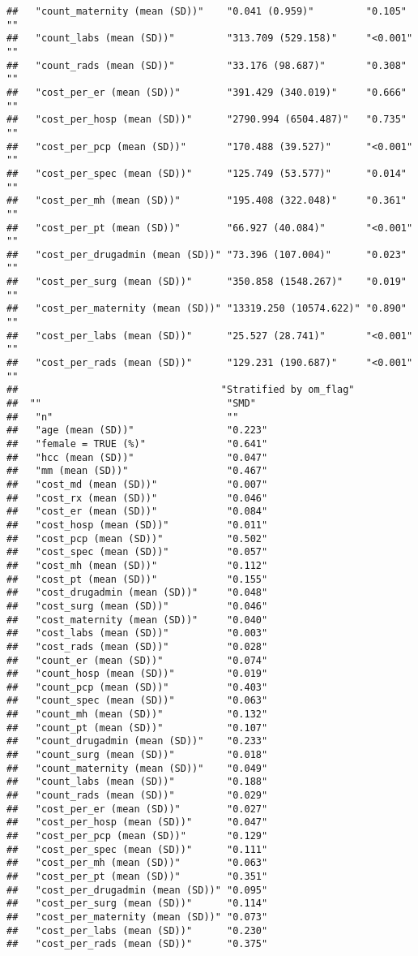 \documentclass[]{article}
\begin{document}
\begin{verbatim}
##   "count_maternity (mean (SD))"    "0.041 (0.959)"         "0.105"  ""    
##   "count_labs (mean (SD))"         "313.709 (529.158)"     "<0.001" ""    
##   "count_rads (mean (SD))"         "33.176 (98.687)"       "0.308"  ""    
##   "cost_per_er (mean (SD))"        "391.429 (340.019)"     "0.666"  ""    
##   "cost_per_hosp (mean (SD))"      "2790.994 (6504.487)"   "0.735"  ""    
##   "cost_per_pcp (mean (SD))"       "170.488 (39.527)"      "<0.001" ""    
##   "cost_per_spec (mean (SD))"      "125.749 (53.577)"      "0.014"  ""    
##   "cost_per_mh (mean (SD))"        "195.408 (322.048)"     "0.361"  ""    
##   "cost_per_pt (mean (SD))"        "66.927 (40.084)"       "<0.001" ""    
##   "cost_per_drugadmin (mean (SD))" "73.396 (107.004)"      "0.023"  ""    
##   "cost_per_surg (mean (SD))"      "350.858 (1548.267)"    "0.019"  ""    
##   "cost_per_maternity (mean (SD))" "13319.250 (10574.622)" "0.890"  ""    
##   "cost_per_labs (mean (SD))"      "25.527 (28.741)"       "<0.001" ""    
##   "cost_per_rads (mean (SD))"      "129.231 (190.687)"     "<0.001" ""    
##                                   "Stratified by om_flag"
##  ""                                "SMD"  
##   "n"                              ""     
##   "age (mean (SD))"                "0.223"
##   "female = TRUE (%)"              "0.641"
##   "hcc (mean (SD))"                "0.047"
##   "mm (mean (SD))"                 "0.467"
##   "cost_md (mean (SD))"            "0.007"
##   "cost_rx (mean (SD))"            "0.046"
##   "cost_er (mean (SD))"            "0.084"
##   "cost_hosp (mean (SD))"          "0.011"
##   "cost_pcp (mean (SD))"           "0.502"
##   "cost_spec (mean (SD))"          "0.057"
##   "cost_mh (mean (SD))"            "0.112"
##   "cost_pt (mean (SD))"            "0.155"
##   "cost_drugadmin (mean (SD))"     "0.048"
##   "cost_surg (mean (SD))"          "0.046"
##   "cost_maternity (mean (SD))"     "0.040"
##   "cost_labs (mean (SD))"          "0.003"
##   "cost_rads (mean (SD))"          "0.028"
##   "count_er (mean (SD))"           "0.074"
##   "count_hosp (mean (SD))"         "0.019"
##   "count_pcp (mean (SD))"          "0.403"
##   "count_spec (mean (SD))"         "0.063"
##   "count_mh (mean (SD))"           "0.132"
##   "count_pt (mean (SD))"           "0.107"
##   "count_drugadmin (mean (SD))"    "0.233"
##   "count_surg (mean (SD))"         "0.018"
##   "count_maternity (mean (SD))"    "0.049"
##   "count_labs (mean (SD))"         "0.188"
##   "count_rads (mean (SD))"         "0.029"
##   "cost_per_er (mean (SD))"        "0.027"
##   "cost_per_hosp (mean (SD))"      "0.047"
##   "cost_per_pcp (mean (SD))"       "0.129"
##   "cost_per_spec (mean (SD))"      "0.111"
##   "cost_per_mh (mean (SD))"        "0.063"
##   "cost_per_pt (mean (SD))"        "0.351"
##   "cost_per_drugadmin (mean (SD))" "0.095"
##   "cost_per_surg (mean (SD))"      "0.114"
##   "cost_per_maternity (mean (SD))" "0.073"
##   "cost_per_labs (mean (SD))"      "0.230"
##   "cost_per_rads (mean (SD))"      "0.375"
\end{verbatim}
\end{document}
